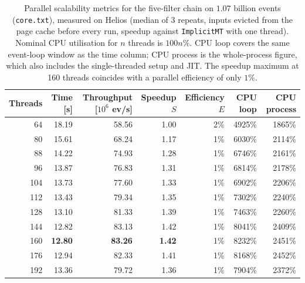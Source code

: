 \begin{table}[htbp]
\centering
\caption{Parallel scalability metrics for the five-filter chain on $1.07$ billion events (\texttt{core.txt}), measured on Helios (median of 3 repeats, inputs evicted from the page cache before every run, speedup against \texttt{ImplicitMT} with one thread). Nominal CPU utilisation for $n$ threads is $100n\%$. CPU loop covers the same event-loop window as the time column; CPU process is the whole-process figure, which also includes the single-threaded setup and JIT. The speedup maximum at 160 threads coincides with a parallel efficiency of only $1\%$.}
\label{tab:scalability-chain}
\begin{tabular}{rrrrrrr}
\toprule
Threads & Time [s] & Throughput [$10^6$ ev/s] & Speedup $S$ & Efficiency $E$ & CPU loop & CPU process \\
\midrule
64 & 18.19 & 58.56 & 1.00 & 2\% & 4925\% & 1865\% \\
80 & 15.61 & 68.24 & 1.17 & 1\% & 6030\% & 2114\% \\
88 & 14.22 & 74.93 & 1.28 & 1\% & 6746\% & 2161\% \\
96 & 13.87 & 76.83 & 1.31 & 1\% & 6814\% & 2178\% \\
104 & 13.73 & 77.60 & 1.33 & 1\% & 6902\% & 2206\% \\
112 & 13.43 & 79.34 & 1.35 & 1\% & 7302\% & 2240\% \\
128 & 13.10 & 81.33 & 1.39 & 1\% & 7463\% & 2260\% \\
144 & 12.82 & 83.13 & 1.42 & 1\% & 8041\% & 2409\% \\
160 & \textbf{12.80} & \textbf{83.26} & \textbf{1.42} & 1\% & 8232\% & 2451\% \\
176 & 12.94 & 82.33 & 1.41 & 1\% & 8168\% & 2452\% \\
192 & 13.36 & 79.72 & 1.36 & 1\% & 7904\% & 2372\% \\
\bottomrule
\end{tabular}
\end{table}
